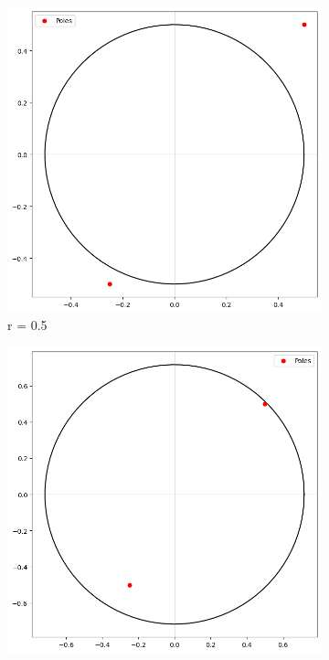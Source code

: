 \documentclass[a4paper]{report}
\begin{document}
\begin{figure}[H]
    \begin{subfigure}{.25\linewidth}
      \includegraphics[width=\linewidth]{images/invalid_contour.png}
      \caption{r = 0.5}
    \end{subfigure}\hfill
    \begin{subfigure}{.25\linewidth}
      \includegraphics[width=\linewidth]{images/valid_border_contour.png}

\end{subfigure}
\end{figure}
\end{document}
